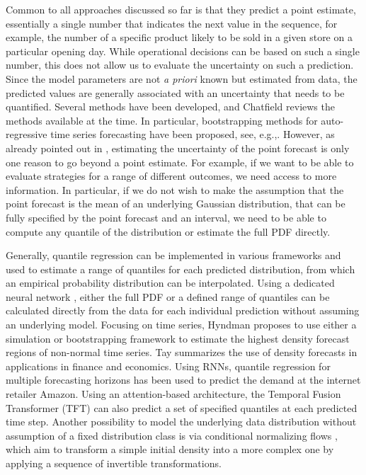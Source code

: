 \documentclass[BCOR=1mm, DIV=calc,10pt,
twoside=true,
twocolumn,
headings=normal]{scrartcl}
\begin{document}
Common to all approaches discussed so far is that they predict a point estimate, essentially a single number that indicates the next value in the sequence, for example, the number of a specific product likely to be sold in a given store on a particular opening day. While operational decisions can be based on such a single number, this does not allow us to evaluate the uncertainty on such a prediction. Since the model parameters are not {\em a priori} known but estimated from data, the predicted values are generally associated with an uncertainty that needs to be quantified. Several methods have been developed, and Chatfield \cite{chatfield1993calculating} reviews the methods available at the time. In particular, bootstrapping methods for auto-regressive time series forecasting have been proposed, see, e.g.,\cite{masarotto1990bootstrap,mccullough1994bootstrapping,mccullough1996consistent,grigoletto1998bootstrap,thombs1990bootstrap,clements2001bootstrapping,Angus1994,pascual2004bootstrap,pascual2001effects,pascual2005bootstrap}. However, as already pointed out in \cite{chatfield1993calculating}, estimating the uncertainty of the point forecast is only one reason to go beyond a point estimate. For example, if we want to be able to evaluate strategies for a range of different outcomes, we need access to more information. In particular, if we do not wish to make the assumption that the point forecast is the mean of an underlying Gaussian distribution, that can be fully specified by the point forecast and an interval, we need to be able to compute any quantile of the distribution or estimate the full PDF directly.

Generally, quantile regression \cite{koenker2001,wen2017} can be implemented in various frameworks and used to estimate a range of quantiles for each predicted distribution, from which an empirical probability distribution can be interpolated. Using a dedicated neural network \cite{Feindt2006190}, either the full PDF or a defined range of quantiles can be calculated directly from the data for each individual prediction without assuming an underlying model. Focusing on time series, Hyndman \cite{hyndman1995highest} proposes to use either a simulation or bootstrapping framework to estimate the highest density forecast regions of non-normal time series. Tay \cite{tay2000density} summarizes the use of density forecasts in applications in finance and economics. Using RNNs, quantile regression for multiple forecasting horizons \cite{wen2017multi} has been used to predict the demand at the internet retailer Amazon. Using an attention-based architecture, the Temporal Fusion Transformer (TFT) \cite{lim2019temporal} can also predict a set of specified quantiles at each predicted time step. Another possibility to model the underlying data distribution without assumption of a fixed distribution class is via conditional normalizing flows \cite{rezende2016variational,timeseriesflow}, which aim to transform a simple initial density into a more complex one by applying a sequence of invertible transformations.
\end{document}
